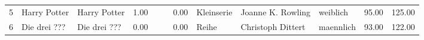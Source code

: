 \begin{table}
\begin{center}
{\begin{tabular}{rllrllrlllrr}
  5 & Harry Potter                                                                                                                                                                                                                                                    & Harry Potter                                                                                                                                                                                                                                                    & 1.00 &                                                                                                                                                                                                                                                                 &                                                                                                                                                                                                                                                                 & 0.00 & Kleinserie & Joanne K. Rowling                                                                                                                                                                                                                                               & weiblich & 95.00 & 125.00 \\ 
  6 & Die drei ???                                                                                                                                                                                                                                                    & Die drei ???                                                                                                                                                                                                                                                    & 0.00 &                                                                                                                                                                                                                                                                 &                                                                                                                                                                                                                                                                 & 0.00 & Reihe & Christoph Dittert                                                                                                                                                                                                                                               & maennlich & 93.00 & 122.00 \\ 

\end{tabular}}
\end{center}
\end{table}
